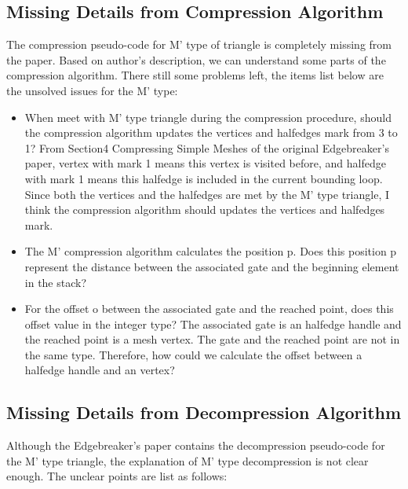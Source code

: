 \documentclass[onecolumn, 12pt]{article}
\begin{document}
{\begin{appendices}
\subsection{Missing Details from Compression Algorithm}
The compression pseudo-code for M' type of triangle is completely missing from the paper. Based on author's description, we can understand some parts of the compression algorithm. There still some problems left, the items list below are the unsolved issues for the M' type:

\begin{itemize}
\item When meet with M' type triangle during the compression procedure, should the compression algorithm updates the vertices and halfedges mark from 3 to 1? From Section4 Compressing Simple Meshes of the original Edgebreaker's paper, vertex with mark 1 means this vertex is visited before, and halfedge with mark 1 means this halfedge is included in the current bounding loop. Since both the vertices and the halfedges are met by the M' type triangle, I think the compression algorithm should updates the vertices and halfedges mark.
\item The M' compression algorithm calculates the position p. Does this position p represent the distance between the associated gate and the beginning element in the stack?
\item For the offset o between the associated gate and the reached point, does this offset value in the integer type? The associated gate is an halfedge handle and the reached point is a mesh vertex. The gate and the reached point are not in the same type. Therefore, how could we calculate the offset between a halfedge handle and an vertex?
\end{itemize}


\subsection{Missing Details from Decompression Algorithm}
Although the Edgebreaker's paper contains the decompression pseudo-code for the M' type triangle, the explanation of M' type decompression is not clear enough. The unclear points are list as follows:


\end{appendices}}
\end{document}
